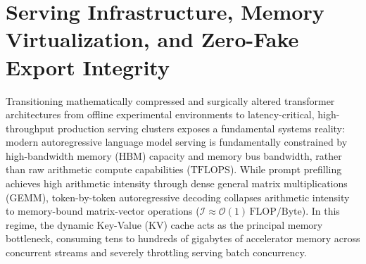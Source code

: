 \section{Serving Infrastructure, Memory Virtualization, and Zero-Fake Export Integrity}
\label{sec:serving_deployment}

Transitioning mathematically compressed and surgically altered transformer architectures from offline experimental environments to latency-critical, high-throughput production serving clusters exposes a fundamental systems reality: modern autoregressive language model serving is fundamentally constrained by high-bandwidth memory (HBM) capacity and memory bus bandwidth, rather than raw arithmetic compute capabilities ($\text{TFLOPS}$). While prompt prefilling achieves high arithmetic intensity through dense general matrix multiplications (GEMM), token-by-token autoregressive decoding collapses arithmetic intensity to memory-bound matrix-vector operations ($\mathcal{I} \approx \mathcal{O}(1)\,\text{FLOP/Byte}$). In this regime, the dynamic Key-Value (KV) cache acts as the principal memory bottleneck, consuming tens to hundreds of gigabytes of accelerator memory across concurrent streams and severely throttling serving batch concurrency.

